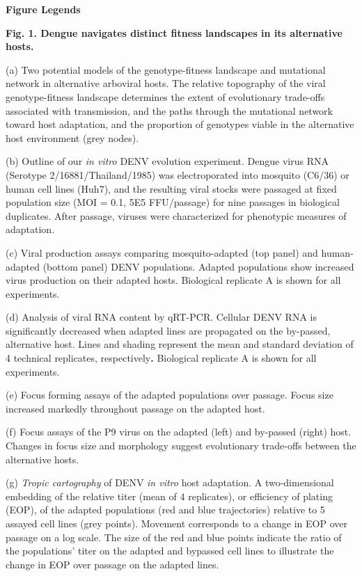\documentclass[
]{article}
\begin{document}
\textbf{{Figure Legends}}

\textbf{Fig. 1. Dengue navigates distinct fitness landscapes in its
alternative hosts.}

(a) Two potential models of the genotype-fitness landscape and
mutational network in alternative arboviral hosts. The relative
topography of the viral genotype-fitness landscape determines the extent
of evolutionary trade-offs associated with transmission, and the paths
through the mutational network toward host adaptation, and the
proportion of genotypes viable in the alternative host environment (grey
nodes).

(b) Outline of our \emph{in vitro} DENV evolution experiment. Dengue
virus RNA (Serotype 2/16881/Thailand/1985) was electroporated into
mosquito (C6/36) or human cell lines (Huh7), and the resulting viral
stocks were passaged at fixed population size (MOI = 0.1, 5E5
FFU/passage) for nine passages in biological duplicates. After passage,
viruses were characterized for phenotypic measures of adaptation.

(c) Viral production assays comparing mosquito-adapted (top panel) and
human-adapted (bottom panel) DENV populations. Adapted populations show
increased virus production on their adapted hosts. Biological replicate
A is shown for all experiments.

(d) Analysis of viral RNA content by qRT-PCR. Cellular DENV RNA is
significantly decreased when adapted lines are propagated on the
by-passed, alternative host. Lines and shading represent the mean and
standard deviation of 4 technical replicates, respectively\textbf{.}
Biological replicate A is shown for all experiments.

(e) Focus forming assays of the adapted populations over passage. Focus
size increased markedly throughout passage on the adapted host.

(f) Focus assays of the P9 virus on the adapted (left) and by-passed
(right) host. Changes in focus size and morphology suggest evolutionary
trade-offs between the alternative hosts.

(g) \emph{Tropic cartography} of DENV \emph{in vitro} host adaptation. A
two-dimensional embedding of the relative titer (mean of 4 replicates),
or efficiency of plating (EOP), of the adapted populations (red and blue
trajectories) relative to 5 assayed cell lines (grey points). Movement
corresponds to a change in EOP over passage on a log scale. The size of
the red and blue points indicate the ratio of the populations' titer on
the adapted and bypassed cell lines to illustrate the change in EOP over
passage on the adapted lines.
\end{document}
